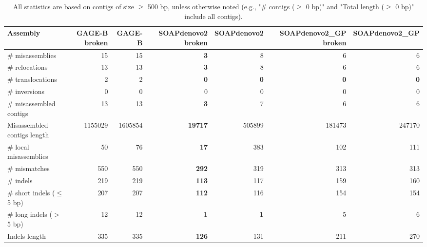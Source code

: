 \documentclass[12pt,a4paper]{article}
\begin{document}
\begin{table}[ht]
\begin{center}
\caption{All statistics are based on contigs of size $\geq$ 500 bp, unless otherwise noted (e.g., "\# contigs ($\geq$ 0 bp)" and "Total length ($\geq$ 0 bp)" include all contigs).}
\begin{tabular}{|l*{6}{|r}|}
\hline
Assembly & GAGE-B broken & GAGE-B & SOAPdenovo2 broken & SOAPdenovo2 & SOAPdenovo2\_GP broken & SOAPdenovo2\_GP \\ \hline
\# misassemblies & 15 & 15 & {\bf 3} & 8 & 6 & 6 \\ \hline
\hspace{5mm}\# relocations & 13 & 13 & {\bf 3} & 8 & 6 & 6 \\ \hline
\hspace{5mm}\# translocations & 2 & 2 & {\bf 0} & {\bf 0} & {\bf 0} & {\bf 0} \\ \hline
\hspace{5mm}\# inversions & 0 & 0 & 0 & 0 & 0 & 0 \\ \hline
\# misassembled contigs & 13 & 13 & {\bf 3} & 7 & 6 & 6 \\ \hline
Misassembled contigs length & 1155029 & 1605854 & {\bf 19717} & 505899 & 181473 & 247170 \\ \hline
\# local misassemblies & 50 & 76 & {\bf 17} & 383 & 102 & 111 \\ \hline
\# mismatches & 550 & 550 & {\bf 292} & 319 & 313 & 313 \\ \hline
\# indels & 219 & 219 & {\bf 113} & 117 & 159 & 160 \\ \hline
\hspace{5mm}\# short indels ($\leq$ 5 bp) & 207 & 207 & {\bf 112} & 116 & 154 & 154 \\ \hline
\hspace{5mm}\# long indels ($>$ 5 bp) & 12 & 12 & {\bf 1} & {\bf 1} & 5 & 6 \\ \hline
Indels length & 335 & 335 & {\bf 126} & 131 & 211 & 270 \\ \hline
\end{tabular}
\end{center}
\end{table}
\end{document}
